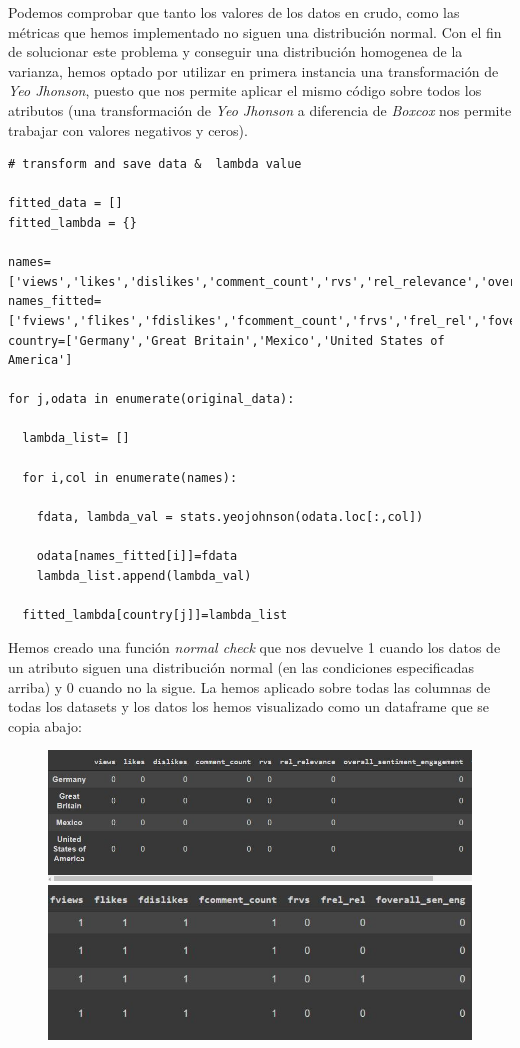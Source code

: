 \documentclass[a4paper,12pt]{article}
\begin{document}
Podemos comprobar que tanto los valores de los datos en crudo, como las m\'etricas que hemos implementado no siguen una distribuci\'on normal. Con el fin de solucionar este problema y conseguir una distribuci\'on homogenea de la varianza, hemos optado por utilizar en primera instancia una transformaci\'on de {\itshape Yeo Jhonson}, puesto que nos permite aplicar el mismo c\'odigo sobre todos los atributos (una transformaci\'on de {\itshape Yeo Jhonson} a diferencia de {\itshape Boxcox} nos permite trabajar con valores negativos y ceros).

\begin{verbatim}
# transform and save data &  lambda value 

fitted_data = []
fitted_lambda = {}

names=['views','likes','dislikes','comment_count','rvs','rel_relevance','overall_sentiment_engagement']
names_fitted=['fviews','flikes','fdislikes','fcomment_count','frvs','frel_rel','foverall_sen_eng']
country=['Germany','Great Britain','Mexico','United States of America']

for j,odata in enumerate(original_data):

  lambda_list= []

  for i,col in enumerate(names):
    
    fdata, lambda_val = stats.yeojohnson(odata.loc[:,col])

    odata[names_fitted[i]]=fdata
    lambda_list.append(lambda_val)
  
  fitted_lambda[country[j]]=lambda_list

\end{verbatim}

Hemos creado una funci\'on {\itshape normal check} que nos devuelve 1 cuando los datos de un atributo siguen una distribuci\'on normal (en las condiciones especificadas arriba) y 0 cuando no la sigue. La hemos aplicado sobre todas las columnas de todas los datasets y los datos los hemos visualizado como un dataframe que se copia abajo:

\begin{figure}
\centering
\includegraphics[width=12cm]{dataframe_1.JPG}
\includegraphics[width=12cm]{dataframe_2.JPG}
\end{figure}
 
\end{document}
